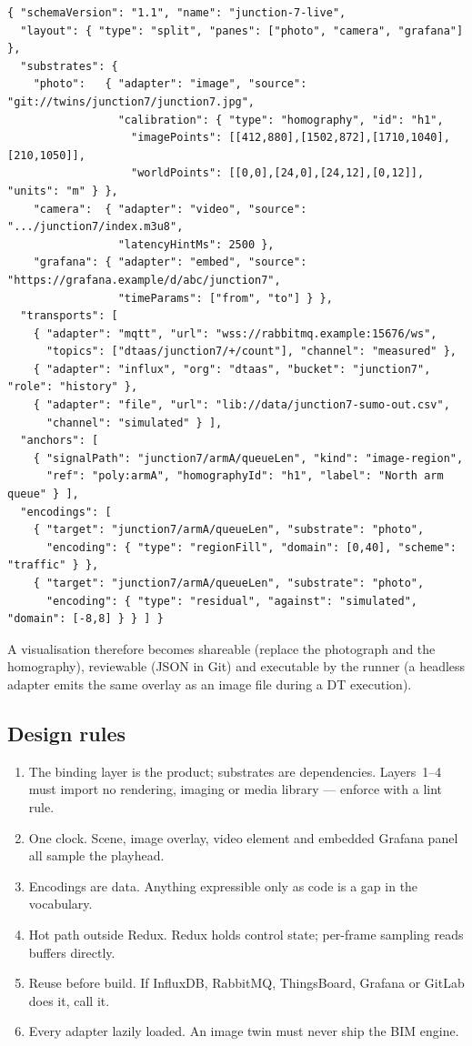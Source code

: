 \begin{lstlisting}
{ "schemaVersion": "1.1", "name": "junction-7-live",
  "layout": { "type": "split", "panes": ["photo", "camera", "grafana"] },
  "substrates": {
    "photo":   { "adapter": "image", "source": "git://twins/junction7/junction7.jpg",
                 "calibration": { "type": "homography", "id": "h1",
                   "imagePoints": [[412,880],[1502,872],[1710,1040],[210,1050]],
                   "worldPoints": [[0,0],[24,0],[24,12],[0,12]], "units": "m" } },
    "camera":  { "adapter": "video", "source": ".../junction7/index.m3u8",
                 "latencyHintMs": 2500 },
    "grafana": { "adapter": "embed", "source": "https://grafana.example/d/abc/junction7",
                 "timeParams": ["from", "to"] } },
  "transports": [
    { "adapter": "mqtt", "url": "wss://rabbitmq.example:15676/ws",
      "topics": ["dtaas/junction7/+/count"], "channel": "measured" },
    { "adapter": "influx", "org": "dtaas", "bucket": "junction7", "role": "history" },
    { "adapter": "file", "url": "lib://data/junction7-sumo-out.csv",
      "channel": "simulated" } ],
  "anchors": [
    { "signalPath": "junction7/armA/queueLen", "kind": "image-region",
      "ref": "poly:armA", "homographyId": "h1", "label": "North arm queue" } ],
  "encodings": [
    { "target": "junction7/armA/queueLen", "substrate": "photo",
      "encoding": { "type": "regionFill", "domain": [0,40], "scheme": "traffic" } },
    { "target": "junction7/armA/queueLen", "substrate": "photo",
      "encoding": { "type": "residual", "against": "simulated", "domain": [-8,8] } } ] }
\end{lstlisting}

A visualisation therefore becomes shareable (replace the photograph and the homography),
reviewable (JSON in Git) and executable by the runner (a headless adapter emits the same
overlay as an image file during a DT execution).

\subsection{Design rules}

\begin{enumerate}[itemsep=1pt]
  \item The binding layer is the product; substrates are dependencies. Layers~1--4 must
        import no rendering, imaging or media library --- enforce with a lint rule.
  \item One clock. Scene, image overlay, video element and embedded Grafana panel all
        sample the playhead.
  \item Encodings are data. Anything expressible only as code is a gap in the
        vocabulary.
  \item Hot path outside Redux. Redux holds control state; per-frame sampling reads
        buffers directly.
  \item Reuse before build. If InfluxDB, RabbitMQ, ThingsBoard, Grafana or GitLab does
        it, call it.
  \item Every adapter lazily loaded. An image twin must never ship the BIM engine.
\end{enumerate}

